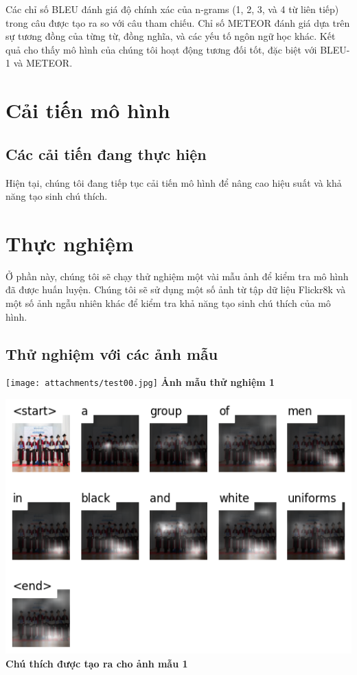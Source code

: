 \documentclass[conference]{IEEEtran}
\begin{document}
Các chỉ số BLEU đánh giá độ chính xác của n-grams (1, 2, 3, và 4 từ liên tiếp) trong câu được tạo ra so với câu tham chiếu. Chỉ số METEOR đánh giá dựa trên sự tương đồng của từng từ, đồng nghĩa, và các yếu tố ngôn ngữ học khác. Kết quả cho thấy mô hình của chúng tôi hoạt động tương đối tốt, đặc biệt với BLEU-1 và METEOR.

\section{Cải tiến mô hình}
\subsection{Các cải tiến đang thực hiện}

Hiện tại, chúng tôi đang tiếp tục cải tiến mô hình để nâng cao hiệu suất và khả năng tạo sinh chú thích.

\section{Thực nghiệm}
Ở phần này, chúng tôi sẽ chạy thử nghiệm một vài mẫu ảnh để kiểm tra mô hình đã được huấn luyện. Chúng tôi sẽ sử dụng một số ảnh từ tập dữ liệu Flickr8k và một số ảnh ngẫu nhiên khác để kiểm tra khả năng tạo sinh chú thích của mô hình.
\subsection{Thử nghiệm với các ảnh mẫu}

\begin{center}
    \begin{minipage}[b]{0.48\textwidth}
        \centering
        \texttt{[image: attachments/test00.jpg]}
        \vspace{0.2cm}
        \textbf{Ảnh mẫu thử nghiệm 1}
    \end{minipage}
    \hfill
    \begin{minipage}[b]{0.48\textwidth}
        \centering
        \includegraphics[width=\linewidth]{attachments/test00_caption.jpg}
        \vspace{0.2cm}
        \textbf{Chú thích được tạo ra cho ảnh mẫu 1}
    \end{minipage}
\end{center}
\end{document}
